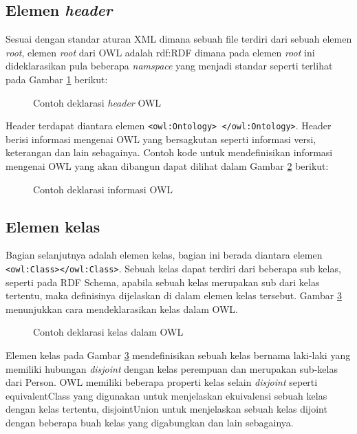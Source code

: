 \subsection{Elemen \emph{header}}
Sesuai dengan standar aturan XML dimana sebuah file terdiri dari sebuah elemen \emph{root}, elemen \emph{root} dari OWL adalah rdf:RDF dimana pada elemen \emph{root} ini dideklarasikan pula beberapa \emph{namspace} yang menjadi standar seperti terlihat pada Gambar \ref{fig:deklarasi_header_owl} berikut:
\begin{figure}[ht]
	\centering
	
	\caption{Contoh deklarasi \emph{header} OWL}
	\label{fig:deklarasi_header_owl}
\end{figure}

Header terdapat diantara elemen \texttt{<owl:Ontology> </owl:Ontology>}. Header berisi informasi mengenai OWL yang bersagkutan seperti informasi versi, keterangan dan lain sebagainya. Contoh kode untuk mendefinisikan informasi mengenai OWL yang akan dibangun dapat dilihat dalam Gambar \ref{fig:deklarasi_informasi_owl} berikut:
\begin{figure}[hb]
	\centering
	
	\caption{Contoh deklarasi informasi OWL}
	\label{fig:deklarasi_informasi_owl}
\end{figure}

\subsection{Elemen kelas}
Bagian selanjutnya adalah elemen kelas, bagian ini berada diantara elemen \texttt{<owl:Class></owl:Class>}. Sebuah kelas dapat terdiri dari beberapa sub kelas, seperti pada RDF Schema, apabila sebuah kelas merupakan sub dari kelas tertentu, maka definisinya dijelaskan di dalam elemen kelas tersebut. Gambar \ref{fig:deklarasi_kelas_owl} menunjukkan cara mendeklarasikan kelas dalam OWL.
\begin{figure}[hb]
	\centering
	
	\caption{Contoh deklarasi kelas dalam OWL}
	\label{fig:deklarasi_kelas_owl}
\end{figure}

Elemen kelas pada Gambar \ref{fig:deklarasi_kelas_owl} mendefinisikan sebuah kelas bernama laki-laki yang memiliki hubungan \emph{disjoint} dengan kelas perempuan dan merupakan sub-kelas dari Person. OWL memiliki beberapa properti kelas selain \emph{disjoint} seperti equivalentClass yang digunakan untuk menjelaskan ekuivalensi sebuah kelas dengan kelas tertentu, disjointUnion untuk menjelaskan sebuah kelas dijoint dengan beberapa buah kelas yang digabungkan dan lain sebagainya.

